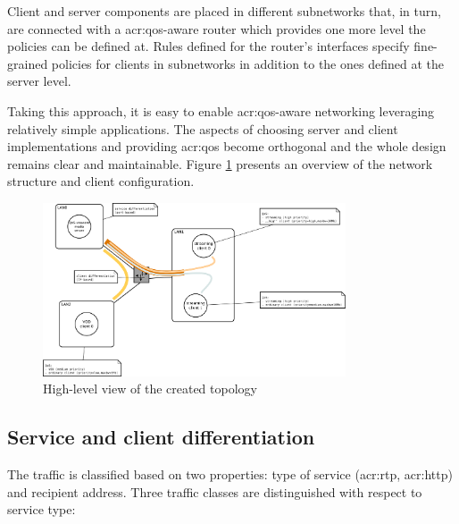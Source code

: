 \documentclass[11pt,openany]{book}
\begin{document}
        Client and server components are placed in different subnetworks that, in turn, are connected with a
        \gls{acr:qos}-aware router which provides one more level the policies can be defined at. Rules defined for the
        router's interfaces specify fine-grained policies for clients in subnetworks in addition to the ones defined at
        the server level.

        Taking this approach, it is easy to enable \gls{acr:qos}-aware networking leveraging relatively simple
        applications. The aspects of choosing server and client implementations and providing \gls{acr:qos} become
        orthogonal and the whole design remains clear and maintainable. Figure \ref{fig:cs:scenario} presents an
        overview of the network structure and client configuration.
      
        \begin{figure}[H]
          \begin{center}
            \includegraphics[width=0.8\textwidth]{img/test-case/diagram.pdf}
          \end{center}

          \caption{High-level view of the created topology}
          \label{fig:cs:scenario}
        \end{figure}
      

      \subsection{Service and client differentiation}
      \label{sub:uc:diff}

        The traffic is classified based on two properties: type of service (\gls{acr:rtp}, \gls{acr:http}) and recipient
        address. Three traffic classes are distinguished with respect to service type:
\end{document}
